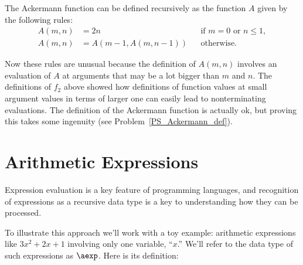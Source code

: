 The Ackermann function can be defined recursively as the function $A$
given by the following rules:
\begin{align}
A(m,n) &=  2n &&\text{if $m=0$ or $n \le 1$},\label{Am0}\\ 
A(m,n) &=  A(m-1,A(m,n-1)) &&\text{otherwise}.\label{AA}
\end{align}

Now these rules are unusual because the definition of $A(m,n)$
involves an evaluation of $A$ at arguments that may be a lot bigger
than $m$ and $n$.  The definitions of $f_2$ above showed how
definitions of function values at small argument values in terms of
larger one can easily lead to nonterminating evaluations.  The
definition of the Ackermann function is actually ok, but proving this
takes some ingenuity (see Problem~\ref{PS_Ackermann_def}).
                            
\begin{problems}
\homeworkproblems
{}
\end{problems}

\section{Arithmetic Expressions}\label{aexp_sec}
Expression evaluation is a key feature of programming languages, and
recognition of expressions as a recursive data type is a key to
understanding how they can be processed.

To illustrate this approach we'll work with a toy example: arithmetic
expressions like $3x^2 + 2x + 1$ involving only one variable, ``$x$.''
We'll refer to the data type of such expressions as $\aexp$.  Here is its
definition:

